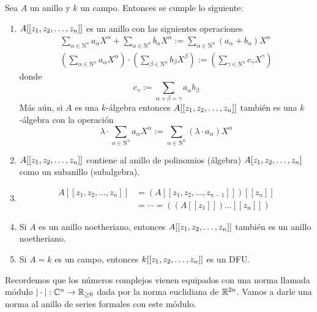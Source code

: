 \begin{theorem}
    Sea $A$ un anillo y $k$ un campo. Entonces se cumple lo siguiente:
    \begin{enumerate}
        \item $A[[z_1,z_2,\dots,z_n]]$ es un anillo con las siguientes operaciones
        \begin{align*}
            \sum_{\alpha\in\mathrm{N}^n}a_{\alpha}X^{\alpha}+\sum_{\alpha\in\mathrm{N}^n}b_{\alpha}X^{\alpha}:=\sum_{\alpha\in\mathrm{N}^n}(a_{\alpha}+b_\alpha)X^{\alpha}\\
            \left(\sum_{\alpha\in\mathrm{N}^n}a_{\alpha}X^{\alpha}\right)\cdot\left(\sum_{\beta\in\mathrm{N}^n}b_{\beta}X^{\beta}\right):=\left(\sum_{\gamma\in\mathrm{N}^n}c_{\gamma}X^{\gamma}\right)
        \end{align*}
        donde 
        \begin{equation*}
            c_\gamma:=\sum_{\alpha+\beta=\gamma}a_\alpha b_\beta
        \end{equation*}
        Más aún, si $A$ es una $k$-álgebra  entonces $A[[z_1,z_2,\dots,z_n]]$ también es una $k$-álgebra con la operación
        \begin{equation*}
        \lambda\cdot\sum_{\alpha\in\mathrm{N}^n}a_{\alpha}X^{\alpha}:=\sum_{\alpha\in\mathrm{N}^n}(\lambda\cdot a_{\alpha})X^{\alpha}
        \end{equation*}
        
    \item $A[[z_1,z_2,\dots,z_n]]$ contiene al anillo de polinomios (álgebra) $A[z_1,z_2,\dots,z_n]$ como un subanillo (subalgebra).

    \item 
    \begin{align*}
        A[[z_1,z_2,\dots,z_n]]&=(A[[z_1,z_2,\dots,z_{n-1}]])[[z_n]]\\
        &=\cdots=((A[[z_1]])\dots [[z_n]])
    \end{align*}
    
    \item Si $A$ es un anillo noetheriano, entonces $A[[z_1,z_2,\dots,z_n]]$ también es un anillo noetheriano.

    \item Si $A=k$ es un campo, entonces $k[[z_1,z_2,\dots,z_n]]$ es un DFU. 
    \end{enumerate}    
\end{theorem}

Recordemos que los números complejos vienen equipados con una norma llamada módulo $|\cdot|:\mathbb{C}^n\to \mathbb{R}_{\geq 0}$ dada por la norma euclidiana de $\mathbb{R}^{2n}$. Vamos a darle una norma al anillo de series formales con este módulo.


